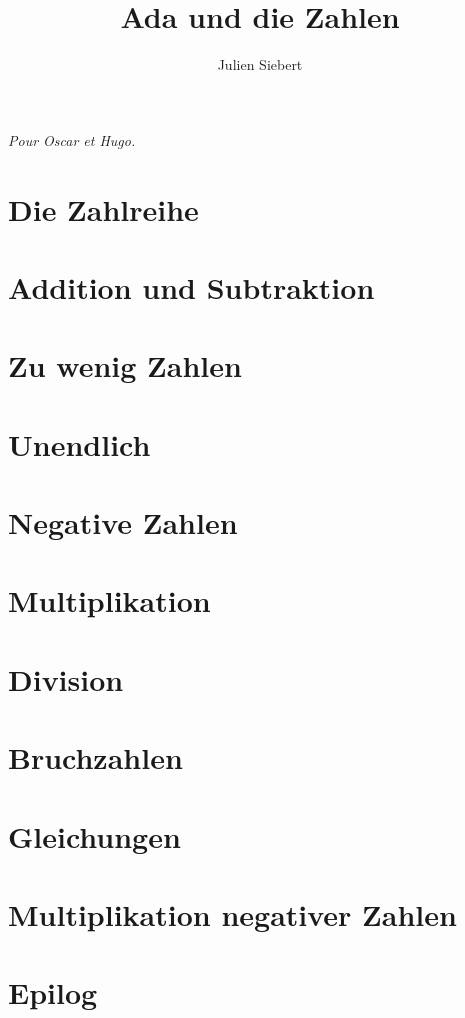 \documentclass[a5paper,11pt,onecolumn]{book}
\title{Ada und die Zahlen}
\author{Julien Siebert}
\begin{document}
\maketitle
\textit{Pour Oscar et Hugo.}
\chapter{Die Zahlreihe}

\chapter[]{Addition und Subtraktion}

\chapter[]{Zu wenig Zahlen}

\chapter[]{Unendlich}

\chapter[]{Negative Zahlen}

\chapter[]{Multiplikation}

\chapter[]{Division}

\chapter[]{Bruchzahlen}

\chapter[]{Gleichungen}

\chapter[]{Multiplikation negativer Zahlen}

\chapter[]{Epilog}

\end{document}
